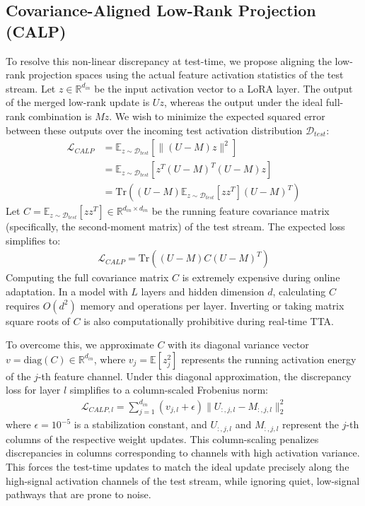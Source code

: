 \documentclass{article}
\begin{document}
\subsection{Covariance-Aligned Low-Rank Projection (CALP)}
To resolve this non-linear discrepancy at test-time, we propose aligning the low-rank projection spaces using the actual feature activation statistics of the test stream. Let $z \in \mathbb{R}^{d_{in}}$ be the input activation vector to a LoRA layer. The output of the merged low-rank update is $U z$, whereas the output under the ideal full-rank combination is $M z$. We wish to minimize the expected squared error between these outputs over the incoming test activation distribution $\mathcal{D}_{test}$:
\begin{align}
\mathcal{L}_{CALP} &= \mathbb{E}_{z \sim \mathcal{D}_{test}} \left[ \| (U - M) z \|^2 \right] \nonumber \\
                   &= \mathbb{E}_{z \sim \mathcal{D}_{test}} \left[ z^T (U - M)^T (U - M) z \right] \nonumber \\
                   &= \text{Tr}\left( (U - M) \mathbb{E}_{z \sim \mathcal{D}_{test}}[z z^T] (U - M)^T \right)
\end{align}
Let $C = \mathbb{E}_{z \sim \mathcal{D}_{test}}[z z^T] \in \mathbb{R}^{d_{in} \times d_{in}}$ be the running feature covariance matrix (specifically, the second-moment matrix) of the test stream. The expected loss simplifies to:
\begin{align}
\mathcal{L}_{CALP} = \text{Tr}\left( (U - M) C (U - M)^T \right)
\end{align}
Computing the full covariance matrix $C$ is extremely expensive during online adaptation. In a model with $L$ layers and hidden dimension $d$, calculating $C$ requires $O(d^2)$ memory and operations per layer. Inverting or taking matrix square roots of $C$ is also computationally prohibitive during real-time TTA. 

To overcome this, we approximate $C$ with its diagonal variance vector $v = \text{diag}(C) \in \mathbb{R}^{d_{in}}$, where $v_j = \mathbb{E}[z_j^2]$ represents the running activation energy of the $j$-th feature channel. Under this diagonal approximation, the discrepancy loss for layer $l$ simplifies to a column-scaled Frobenius norm:
\begin{align}
\mathcal{L}_{CALP, l} = \sum_{j=1}^{d_{in}} (v_{j, l} + \epsilon) \| U_{:, j, l} - M_{:, j, l} \|_2^2
\end{align}
where $\epsilon = 10^{-5}$ is a stabilization constant, and $U_{:, j, l}$ and $M_{:, j, l}$ represent the $j$-th columns of the respective weight updates. This column-scaling penalizes discrepancies in columns corresponding to channels with high activation variance. This forces the test-time updates to match the ideal update precisely along the high-signal activation channels of the test stream, while ignoring quiet, low-signal pathways that are prone to noise.
\end{document}
